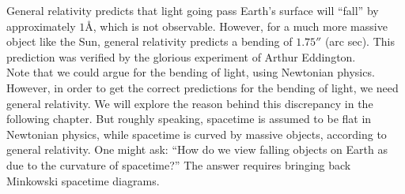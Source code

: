 \documentclass{book}
\theoremstyle{definition}
\begin{document}
General relativity predicts that light going pass Earth's surface will ``fall'' by approximately $1 \text{\AA}$, which is not observable. However, for a much more massive object like the Sun, general relativity predicts a bending of $1.75''$ (arc sec). This prediction was verified by the glorious experiment of Arthur Eddington.\\

Note that we could argue for the bending of light, using Newtonian physics. However, in order to get the correct predictions for the bending of light, we need general relativity. We will explore the reason behind this discrepancy in the following chapter. But roughly speaking, spacetime is assumed to be flat in Newtonian physics, while spacetime is curved by massive objects, according to general relativity. One might ask: ``How do we view falling objects on Earth as due to the curvature of spacetime?'' The answer requires bringing back Minkowski spacetime diagrams.
\end{document}
